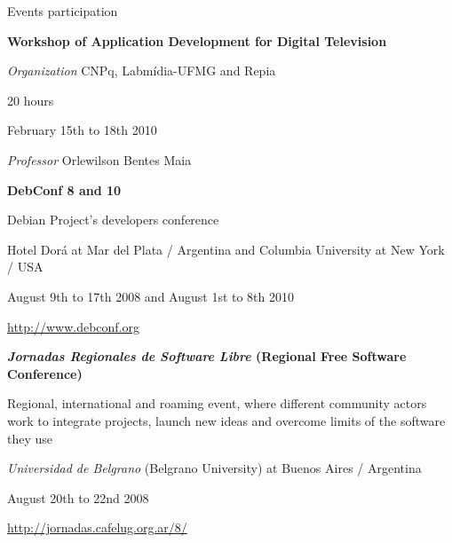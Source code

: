 \begin {rubric} {Events participation}





\entry* [TV Digital]
\textbf{Workshop of Application Development for Digital Television}

\emph{Organization} CNPq, Labmídia-UFMG and Repia

20 hours

February 15th to 18th 2010

\emph{Professor} Orlewilson Bentes Maia

\textbf {DebConf 8 and 10}

Debian Project's developers conference

Hotel Dorá at Mar del Plata / Argentina and Columbia University at New York /
USA

August 9th to 17th 2008 and August 1st to 8th 2010

\url {http://www.debconf.org}

\entry*
\textbf
{\emph{Jornadas Regionales de Software Libre} (Regional Free Software Conference)}

Regional, international and roaming event, where different community actors
work to integrate projects, launch new ideas and overcome limits of the
software they use

\emph{Universidad de Belgrano} (Belgrano University) at Buenos Aires /
Argentina

August 20th to 22nd 2008

\url {http://jornadas.cafelug.org.ar/8/}






\end{rubric}
